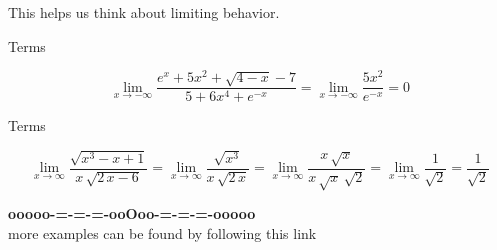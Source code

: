 \documentclass{ximera}
\begin{document}
This helps us think about limiting behavior.



\begin{example} Terms


\[
\lim\limits_{x \to -\infty} \frac{e^{x} + 5x^2 + \sqrt{4-x} - 7}{5 + 6x^4 + e^{-x}} = \lim\limits_{x \to -\infty} \frac{5x^2}{e^{-x}} = 0
\]



\end{example}







\begin{example} Terms


\[
\lim\limits_{x \to \infty} \frac{\sqrt{x^3 - x + 1}}{x \, \sqrt{2 \, x-6}} = \lim\limits_{x \to \infty} \frac{\sqrt{x^3}}{x \, \sqrt{2 \, x}} = \lim\limits_{x \to \infty} \frac{x \, \sqrt{x}}{x \, \sqrt{x} \, \sqrt{2} } = \lim\limits_{x \to \infty} \frac{1}{\sqrt{2} } = \frac{1}{\sqrt{2} }
\]



\end{example}












\begin{onlineOnly}
\begin{center}
\textbf{\textcolor{green!50!black}{ooooo-=-=-=-ooOoo-=-=-=-ooooo}} \\

more examples can be found by following this link\\ 

\end{center}
\end{onlineOnly}
\end{document}
